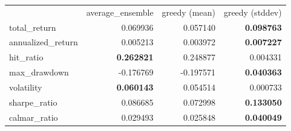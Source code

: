\begin{tabular}{lrrr}
 & average_ensemble & greedy (mean) & greedy (stddev) \\
total_return & 0.069936 & 0.057140 & \bfseries 0.098763 \\
annualized_return & 0.005213 & 0.003972 & \bfseries 0.007227 \\
hit_ratio & \bfseries 0.262821 & 0.248877 & 0.004331 \\
max_drawdown & -0.176769 & -0.197571 & \bfseries 0.040363 \\
volatility & \bfseries 0.060143 & 0.054514 & 0.000733 \\
sharpe_ratio & 0.086685 & 0.072998 & \bfseries 0.133050 \\
calmar_ratio & 0.029493 & 0.025848 & \bfseries 0.040049 \\
\end{tabular}
